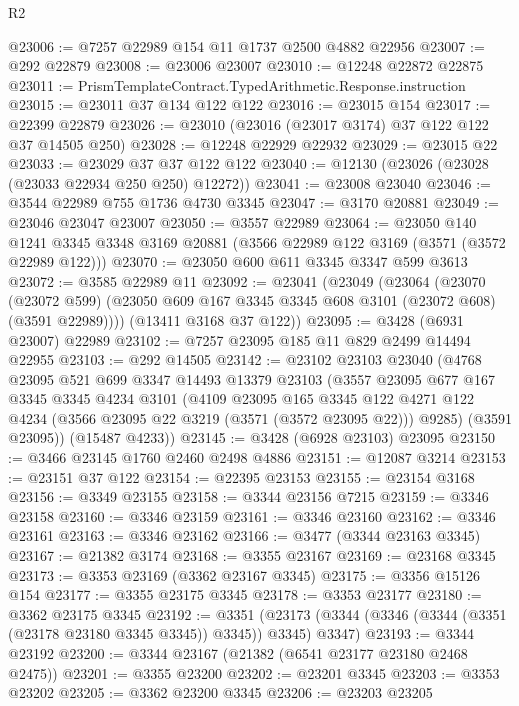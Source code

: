 \begin{lexlean}{R2}
\begin{coremodule}
@23006 := @7257 @22989 @154 @11 @1737 @2500 @4882 @22956
@23007 := @292 @22879
@23008 := @23006 @23007
@23010 := @12248 @22872 @22875
@23011 := PrismTemplateContract.TypedArithmetic.Response.instruction
@23015 := @23011 @37 @134 @122 @122
@23016 := @23015 @154
@23017 := @22399 @22879
@23026 := @23010 (@23016 (@23017 @3174) @37 @122 @122 @37 @14505 @250)
@23028 := @12248 @22929 @22932
@23029 := @23015 @22
@23033 := @23029 @37 @37 @122 @122
@23040 := @12130 (@23026 (@23028 (@23033 @22934 @250 @250) @12272))
@23041 := @23008 @23040
@23046 := @3544 @22989 @755 @1736 @4730 @3345
@23047 := @3170 @20881
@23049 := @23046 @23047 @23007
@23050 := @3557 @22989
@23064 := @23050
    @140
    @1241
    @3345
    @3348
    @3169
    @20881
    (@3566 @22989 @122 @3169 (@3571 (@3572 @22989 @122)))
@23070 := @23050 @600 @611 @3345 @3347 @599 @3613
@23072 := @3585 @22989 @11
@23092 := @23041
    (@23049
      (@23064
        (@23070
          (@23072 @599)
          (@23050 @609 @167 @3345 @3345 @608 @3101 (@23072 @608) (@3591 @22989))))
      (@13411 @3168 @37 @122))
@23095 := @3428 (@6931 @23007) @22989
@23102 := @7257 @23095 @185 @11 @829 @2499 @14494 @22955
@23103 := @292 @14505
@23142 := @23102
    @23103
    @23040
    (@4768
      @23095
      @521
      @699
      @3347
      @14493
      @13379
      @23103
      (@3557
        @23095
        @677
        @167
        @3345
        @3345
        @4234
        @3101
        (@4109
          @23095
          @165
          @3345
          @122
          @4271
          @122
          @4234
          (@3566 @23095 @22 @3219 (@3571 (@3572 @23095 @22)))
          @9285)
        (@3591 @23095))
      (@15487 @4233))
@23145 := @3428 (@6928 @23103) @23095
@23150 := @3466 @23145 @1760 @2460 @2498 @4886
@23151 := @12087 @3214
@23153 := @23151 @37 @122
@23154 := @22395 @23153
@23155 := @23154 @3168
@23156 := @3349 @23155
@23158 := @3344 @23156 @7215
@23159 := @3346 @23158
@23160 := @3346 @23159
@23161 := @3346 @23160
@23162 := @3346 @23161
@23163 := @3346 @23162
@23166 := @3477 (@3344 @23163 @3345)
@23167 := @21382 @3174
@23168 := @3355 @23167
@23169 := @23168 @3345
@23173 := @3353 @23169 (@3362 @23167 @3345)
@23175 := @3356 @15126 @154
@23177 := @3355 @23175 @3345
@23178 := @3353 @23177
@23180 := @3362 @23175 @3345
@23192 := @3351
    (@23173 (@3344 (@3346 (@3344 (@3351 (@23178 @23180 @3345 @3345)) @3345)) @3345) @3347)
@23193 := @3344 @23192
@23200 := @3344 @23167 (@21382 (@6541 @23177 @23180 @2468 @2475))
@23201 := @3355 @23200
@23202 := @23201 @3345
@23203 := @3353 @23202
@23205 := @3362 @23200 @3345
@23206 := @23203 @23205

\end{coremodule}
\end{lexlean}
